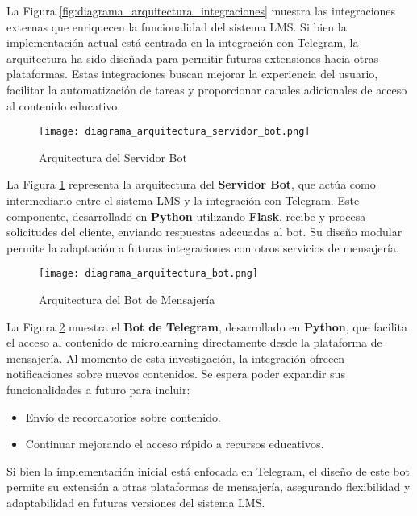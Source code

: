 La Figura \ref{fig:diagrama_arquitectura_integraciones} muestra las
integraciones externas que enriquecen la funcionalidad del sistema LMS. Si bien
la implementación actual está centrada en la integración con Telegram, la
arquitectura ha sido diseñada para permitir futuras extensiones hacia otras
plataformas. Estas integraciones buscan mejorar la experiencia del usuario,
facilitar la automatización de tareas y proporcionar canales adicionales de
acceso al contenido educativo.

\begin{figure}[htbp]
    \centering
    \texttt{[image: diagrama\_arquitectura\_servidor\_bot.png]}
    \caption{Arquitectura del Servidor Bot}
    \label{fig:diagrama_arquitectura_servidor_bot}
\end{figure}

La Figura \ref{fig:diagrama_arquitectura_servidor_bot} representa la
arquitectura del \textbf{Servidor Bot}, que actúa como intermediario entre el
sistema LMS y la integración con Telegram. Este componente, desarrollado en
\textbf{Python} utilizando \textbf{Flask}, recibe y procesa solicitudes del
cliente, enviando respuestas adecuadas al bot. Su diseño modular permite la
adaptación a futuras integraciones con otros servicios de mensajería.

\begin{figure}[htbp]
    \centering
    \texttt{[image: diagrama\_arquitectura\_bot.png]}
    \caption{Arquitectura del Bot de Mensajería}
    \label{fig:diagrama_arquitectura_bot}
\end{figure}

La Figura \ref{fig:diagrama_arquitectura_bot} muestra el \textbf{Bot de
Telegram}, desarrollado en \textbf{Python}, que facilita el acceso al contenido
de microlearning directamente desde la plataforma de mensajería.
Al momento de esta investigación, la integración ofrecen notificaciones sobre nuevos contenidos.
Se espera poder expandir sus funcionalidades a futuro para incluir:
\begin{itemize}
    \item Envío de recordatorios sobre contenido.
    \item Continuar mejorando el acceso rápido a recursos educativos.
\end{itemize}

Si bien la implementación inicial está enfocada en Telegram, el diseño de este
bot permite su extensión a otras plataformas de mensajería, asegurando
flexibilidad y adaptabilidad en futuras versiones del sistema LMS.





